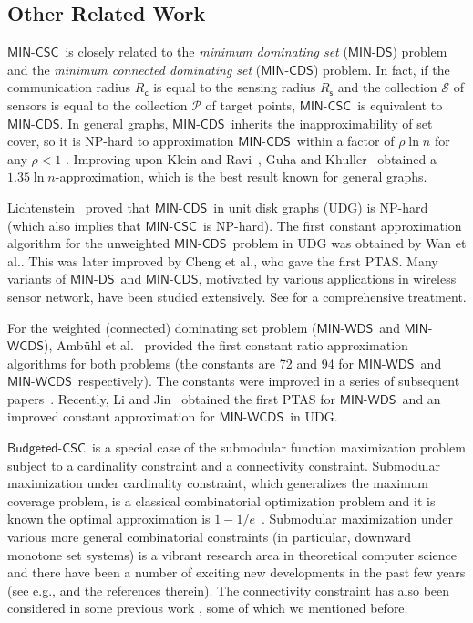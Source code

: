 \documentclass[11pt]{article}
\newcommand{\calP}{{\mathcal P}}
\newcommand{\calS}{{\mathcal S}}
\newcommand{\rednote}[1]{#1}
\newcommand{\mincsc}{$\mathsf{MIN}$-$\mathsf{CSC}$}
\newcommand{\mincds}{$\mathsf{MIN}$-$\mathsf{CDS}$}
\newcommand{\minds}{$\mathsf{MIN}$-$\mathsf{DS}$}
\newcommand{\minwcds}{$\mathsf{MIN}$-$\mathsf{WCDS}$}
\newcommand{\minwds}{$\mathsf{MIN}$-$\mathsf{WDS}$}
\newcommand{\bcsc}{$\mathsf{Budgeted}$-$\mathsf{CSC}$}
\newcommand{\Rc}{R_\mathsf{c}}
\newcommand{\Rs}{R_\mathsf{s}}
\begin{document}
\vspace{-0.2cm}
\subsection{Other Related Work}
\vspace{-0.1cm}


\mincsc\ is closely related to
the {\em minimum dominating set} (\minds) problem
and the {\em minimum connected dominating set} (\mincds) problem.
In fact, if the communication radius $\Rc$ is equal to the sensing radius $\Rs$ and the collection $\calS$ of sensors is equal to the collection $\calP$ of target points,
\mincsc\ is equivalent to \mincds.
In general graphs, \mincds\ inherits the inapproximability of set cover, so it is NP-hard to approximation \mincds\ within a factor of $\rho\ln n$ for any $\rho<1$ \cite{feige1998threshold,dinur2014analytical}.
Improving upon Klein and Ravi~\cite{klein1995nearly}, Guha and Khuller~\cite{guha1999improved} obtained a
$1.35\ln n$-approximation, which is the best result known for general graphs.

Lichtenstein~\cite{lichtenstein1982planar} proved that \mincds\ in unit disk graphs (UDG) is NP-hard (which also implies that \mincsc\ is NP-hard).
The first constant approximation algorithm for the unweighted \mincds\ problem in UDG
was \rednote{obtained} by Wan et al.\cite{wan2002distributed}.
This was later improved by Cheng et al.\cite{cheng2003polynomial}, who gave the first PTAS.
Many variants of \minds\ and \mincds, motivated by various applications in wireless sensor network, 
have been studied extensively. See \cite{du2012connected} for a comprehensive treatment.

For the weighted (connected) dominating set problem (\minwds\ and \minwcds), Amb{\"u}hl et al.~\cite{ambuhl2006constant} \rednote{provided} the first constant ratio approximation algorithms for both problems (the constants are 72 and 94 for \minwds\ and \minwcds\ respectively).
The constants were improved in a series of subsequent
papers~\cite{huang2009better,dai20095+,zou2011new,willsonbetter}. Recently, Li and Jin~\cite{li2015ptas} 
\rednote{obtained} the first PTAS
for \minwds\ and an improved constant approximation for \minwcds\ in UDG.

\bcsc\ is a special case of the submodular function maximization problem subject to a
cardinality constraint and a connectivity constraint.
Submodular maximization under cardinality constraint,
which generalizes the maximum coverage problem, is a classical combinatorial optimization problem and it is known the optimal approximation is $1-1/e$~\cite{nemhauser1978analysis,feige1998threshold}.
Submodular maximization under various more general combinatorial constraints (in particular, downward monotone set systems)
is a vibrant research area in theoretical computer science
and there have been a number of exciting new developments in the past few years
(see e.g., \cite{calinescu2011maximizing,vondrak2011submodular} and the references therein).
The connectivity constraint has also been considered in some previous work \cite{zhang2012complexity,kuo2013maximizing,khuller2014analyzing}, some of which we mentioned before.
\end{document}
